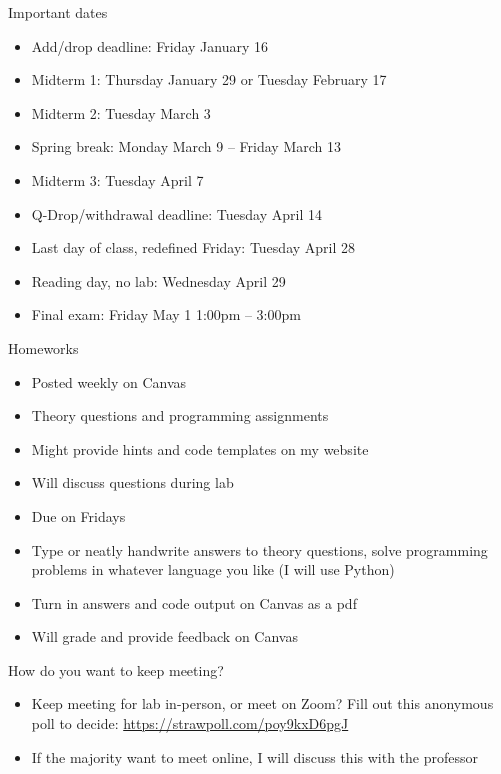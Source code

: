\documentclass{beamer}
\begin{document}
\begin{frame}{Important dates}
  \vfill
  \begin{itemize}
    \item Add/drop deadline: Friday January 16
      \vfill
    \item Midterm 1: Thursday January 29 or Tuesday February 17
      \vfill
    \item Midterm 2: Tuesday March 3
      \vfill
    \item Spring break: Monday March 9 -- Friday March 13
      \vfill
    \item Midterm 3: Tuesday April 7
      \vfill
    \item Q-Drop/withdrawal deadline: Tuesday April 14
      \vfill
    \item Last day of class, redefined Friday: Tuesday April 28
      \vfill
    \item Reading day, no lab: Wednesday April 29
      \vfill
    \item Final exam: Friday May 1 1:00pm -- 3:00pm
  \end{itemize}
  \vfill
\end{frame}

\begin{frame}{Homeworks}
  \vfill
  \begin{itemize}
    \item Posted weekly on Canvas
      \vfill
    \item Theory questions and programming assignments
      \vfill
    \item Might provide hints and code templates on my website
      \vfill
    \item Will discuss questions during lab
      \vfill
    \item Due on Fridays
      \vfill
    \item Type or neatly handwrite answers to theory questions, solve programming problems in whatever language you like (I will use Python)
      \vfill
    \item Turn in answers and code output on Canvas as a pdf
      \vfill
    \item Will grade and provide feedback on Canvas
  \end{itemize}
  \vfill
\end{frame}

\begin{frame}{How do you want to keep meeting?}
  \vfill
  \begin{itemize}
    \item Keep meeting for lab in-person, or meet on Zoom? 
      Fill out this anonymous poll to decide: \url{https://strawpoll.com/poy9kxD6pgJ}
      \vfill
    \item If the majority want to meet online, I will discuss this with the professor
  \end{itemize}
  \vfill
\end{frame}
\end{document}
